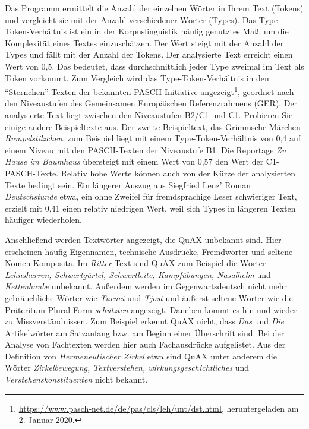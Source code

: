 \documentclass[11pt]{article}\usepackage[]{graphicx}\usepackage[]{color}
\begin{document}
Das Programm ermittelt die Anzahl der einzelnen Wörter in Ihrem Text (Tokens) und vergleicht sie mit der Anzahl verschiedener Wörter (Types). Das Type-Token-Verhältnis ist ein in der Korpuslinguistik häufig genutztes Maß, um die Komplexität eines Textes einzuschätzen. Der Wert steigt mit der Anzahl der Types und fällt mit der Anzahl der Tokens. Der analysierte Text erreicht einen Wert von 0,5. Das bedeutet, dass durchschnittlich jeder Type zweimal im Text als Token vorkommt. Zum Vergleich wird das Type-Token-Verhältnis in den "`Sternchen"'-Texten der bekannten PASCH-Initiative angezeigt\footnote{\url{https://www.pasch-net.de/de/pas/cls/leh/unt/dst.html}, heruntergeladen am 2. Januar 2020.}, geordnet nach den Niveaustufen des Gemeinsamen Europäischen Referenzrahmens (GER). Der analysierte Text liegt zwischen den Niveaustufen B2/C1 und C1. Probieren Sie einige andere Beispieltexte aus. Der zweite Beispieltext, das Grimmsche Märchen \textit{Rumpelstilzchen}, zum Beispiel liegt mit einem Type-Token-Verhältnis von 0,4 auf einem Niveau mit den PASCH-Texten der Niveaustufe B1. Die Reportage \textit{Zu Hause im Baumhaus} übersteigt mit einem Wert von 0,57 den Wert der C1-PASCH-Texte. Relativ hohe Werte können auch von der Kürze der analysierten Texte bedingt sein. Ein längerer Auszug aus Siegfried Lenz' Roman \textit{Deutschstunde} etwa, ein ohne Zweifel für fremdsprachige Leser schwieriger Text, erzielt mit 0,41 einen relativ niedrigen Wert, weil sich Types in längeren Texten häufiger wiederholen. 

Anschließend werden Textwörter angezeigt, die QuAX unbekannt sind. Hier erscheinen häufig Eigennamen, technische Ausdrücke, Fremdwörter und seltene Nomen-Komposita. Im \textit{Ritter}-Text sind QuAX zum Beispiel die Wörter \textit{Lehnsherren, Schwertgürtel, Schwertleite, Kampfübungen, Nasalhelm} und \textit{Kettenhaube} unbekannt. Außerdem werden im Gegenwartsdeutsch nicht mehr gebräuchliche Wörter wie \textit{Turnei} und \textit{Tjost} und äußerst seltene Wörter wie die Präteritum-Plural-Form \textit{schützten} angezeigt. Daneben kommt es hin und wieder zu Missverständnissen. Zum Beispiel erkennt QuAX nicht, dass \textit{Das} und \textit{Die} Artikelwörter am Satzanfang bzw. am Beginn einer Überschrift sind. Bei der Analyse von Fachtexten werden hier auch Fachausdrücke aufgelistet. Aus der Definition von \textit{Hermeneutischer Zirkel} etwa sind QuAX unter anderem die Wörter \textit{Zirkelbewegung, Textverstehen, wirkungsgeschichtliches} und \textit{Verstehenskonstituenten} nicht bekannt. 
\end{document}
